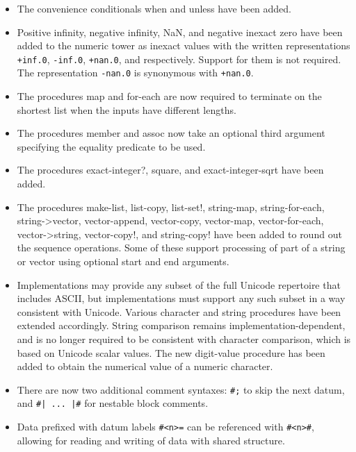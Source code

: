 \begin{itemize}
\item The convenience conditionals {\cf when} and {\cf unless} have been added.

\item Positive infinity, negative infinity, NaN, and negative inexact zero have been added
to the numeric tower as inexact values with the written
representations {\tt +inf.0}, {\tt -inf.0}, {\tt +nan.0}, and {}
respectively.  Support for them is not required.
The representation {\tt -nan.0} is synonymous with {\tt +nan.0}.

\item The procedures {\cf map} and {\cf for-each} are now required to terminate on
the shortest list when the inputs have different lengths.

\item The procedures {\cf member} and {\cf assoc} now take an optional third argument
specifying the equality predicate to be used.

\item The procedures {\cf exact-integer?}, {\cf square},
and {\cf exact-integer-sqrt} have been added.

\item The procedures {\cf make-list}, {\cf list-copy}, {\cf list-set!},
{\cf string-map}, {\cf string-for-each}, {\cf string->vector}, 
{\cf vector-append},
{\cf vector-copy}, {\cf vector-map}, {\cf vector-for-each}, 
{\cf vector->string}, {\cf vector-copy!}, and {\cf string-copy!}
have been added to round out the sequence operations.
Some of these support processing of part of a string or vector using
optional start and end arguments.

\item Implementations may provide any subset of the full Unicode
repertoire that includes ASCII, but implementations must support any
such subset in a way consistent with Unicode.
Various character and string procedures have been extended accordingly.
String comparison remains implementation-dependent, and is no longer
required to be consistent with character comparison, which is based
on Unicode scalar values.
The new {\cf digit-value} procedure has been added to obtain the numerical
value of a numeric character.

\item There are now two additional comment syntaxes: {\tt \#;} to
skip the next datum, and {\tt \#| ... |\#}
for nestable block comments.

\item Data prefixed with datum labels {\tt \#<n>=} can be referenced
with {\tt \#<n>\#}, allowing for reading and writing of data with
shared structure.


\end{itemize}
